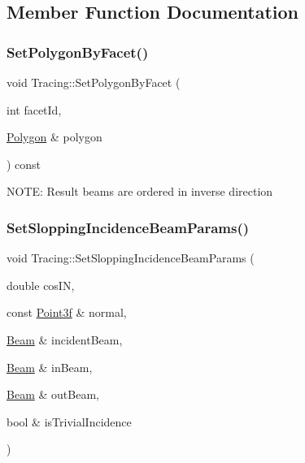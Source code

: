 \subsection{Member Function Documentation}
\mbox{\label{class_tracing_a6968bb9a769fc44e191355d70c0cf56e}} 
\subsubsection{\texorpdfstring{Set\+Polygon\+By\+Facet()}{SetPolygonByFacet()}}
{\footnotesize\ttfamily void Tracing\+::\+Set\+Polygon\+By\+Facet (\begin{DoxyParamCaption}\item[{int}]{facet\+Id,  }\item[{\mbox{\hyperlink{class_polygon}{Polygon}} \&}]{polygon }\end{DoxyParamCaption}) const\hspace{0.3cm}{\ttfamily [protected]}}

N\+O\+TE\+: Result beams are ordered in inverse direction \mbox{\label{class_tracing_a426d2564586b18910ddd7407fcc5fd47}} 
\subsubsection{\texorpdfstring{Set\+Slopping\+Incidence\+Beam\+Params()}{SetSloppingIncidenceBeamParams()}}
{\footnotesize\ttfamily void Tracing\+::\+Set\+Slopping\+Incidence\+Beam\+Params (\begin{DoxyParamCaption}\item[{double}]{cos\+IN,  }\item[{const \mbox{\hyperlink{struct_point3f}{Point3f}} \&}]{normal,  }\item[{\mbox{\hyperlink{class_beam}{Beam}} \&}]{incident\+Beam,  }\item[{\mbox{\hyperlink{class_beam}{Beam}} \&}]{in\+Beam,  }\item[{\mbox{\hyperlink{class_beam}{Beam}} \&}]{out\+Beam,  }\item[{bool \&}]{is\+Trivial\+Incidence }\end{DoxyParamCaption})\hspace{0.3cm}{\ttfamily [protected]}}

